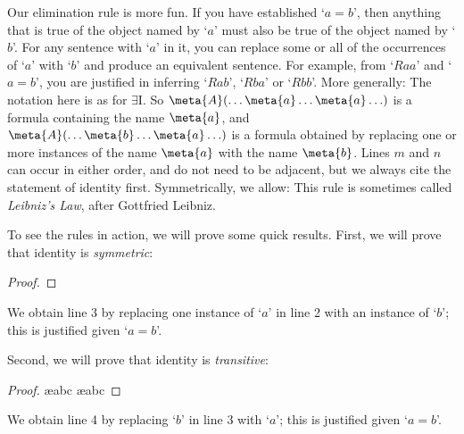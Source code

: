 Our elimination rule is more fun. If you have established `$a=b$', then anything that is true of the object named by `$a$' must also be true of the object named by `$b$'. For any sentence with `$a$' in it, you can replace some or all of the occurrences of `$a$' with `$b$' and produce an equivalent sentence. For example, from `$Raa$' and `$a = b$', you are justified in inferring `$Rab$', `$Rba$' or `$Rbb$'. More generally:
The notation here is as for $\exists$I. So $\meta{A}(\ldots \meta{a} \ldots \meta{a}\ldots)$ is a formula containing the name $\meta{a}$, and $\meta{A}(\ldots \meta{b} \ldots \meta{a}\ldots)$ is a formula obtained by replacing one or more instances of the name $\meta{a}$ with the name $\meta{b}$. Lines $m$ and $n$ can occur in either order, and do not need to be adjacent, but we always cite the statement of identity first. Symmetrically, we allow:
This rule is sometimes called \emph{Leibniz's Law}, after Gottfried Leibniz. 

To see the rules in action, we will prove some quick results. First, we will prove that identity is \emph{symmetric}:
\begin{proof}
	\open
	\close
\end{proof}
We obtain line 3 by replacing one instance of `$a$' in line 2 with an instance of `$b$'; this is justified given `$a= b$'. 

Second, we will prove that identity is \emph{transitive}:
\begin{proof}
	\open
		\ae{abc}
		\ae{abc}
	\close
\end{proof}
We obtain line 4 by replacing `$b$' in line 3 with `$a$'; this is justified given `$a= b$'. 

